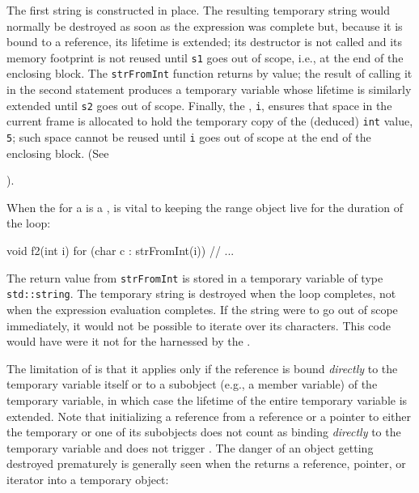 {{\noindent The first string is constructed in place. The resulting temporary string
would normally be destroyed as soon as the expression was complete but,
because it is bound to a reference, its lifetime is extended; its
destructor is not called and its memory footprint is not reused until
\lstinline!s1! goes out of scope, i.e., at the end of the enclosing block.
The \lstinline!strFromInt! function returns by value; the result of calling
it in the second statement produces a temporary variable whose lifetime
is similarly extended until \lstinline!s2! goes out of scope. Finally, the
, \lstinline!i!, ensures that space in the
current frame is allocated to hold the temporary copy of the (deduced)
\lstinline!int! value, \lstinline!5!; such space cannot be reused until
\lstinline!i! goes out of scope at the end of the enclosing block. (See
{).

When the  for a  is a ,  is
vital to keeping the range object live for the duration of the loop:

\begin{emcppslisting}[emcppsbatch=e3]
void f2(int i)
{
    for (char c : strFromInt(i))
    {
        // ...
    }
}
\end{emcppslisting}


\noindent The return value from \lstinline!strFromInt! is stored in a temporary
variable of type \lstinline!std::string!. The temporary string is destroyed
when the loop completes, not when the expression evaluation completes.
If the string were to go out of scope immediately, it would not be
possible to iterate over its characters. This code would have
 were it not for the  harnessed by the .

The limitation of  is that it applies only if
the reference is bound \emph{directly} to the temporary variable itself
or to a subobject (e.g., a member variable) of the temporary variable,
in which case the lifetime of the entire temporary variable is extended.
Note that initializing a reference from a reference or a pointer to
either the temporary or one of its subobjects does not count as binding
\emph{directly} to the temporary variable and does not trigger
. The danger of an object getting destroyed
prematurely is generally seen when the  returns
a reference, pointer, or iterator into a temporary object:

}}}
